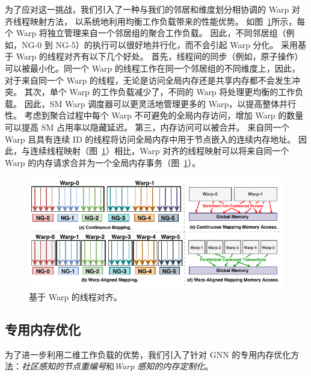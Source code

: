 为了应对这一挑战，我们引入了一种与我们的邻居和维度划分相协调的 Warp 对齐线程映射方法，
以系统地利用均衡工作负载带来的性能优势。
如图~\ref{fig: warp-based Thread Alignment}所示，每个 Warp 将独立管理来自一个邻居组的聚合工作负载。
因此，不同邻居组（例如，NG-0 到 NG-5）的执行可以很好地并行化，而不会引起 Warp 分化。
采用基于 Warp 的线程对齐有以下几个好处。
首先，线程间的同步（例如，原子操作）可以被最小化。同一个 Warp 的线程工作在同一个邻居组的不同维度上，因此，对于来自同一个 Warp 的线程，无论是访问全局内存还是共享内存都不会发生冲突。
其次，单个 Warp 的工作负载减少了，不同的 Warp 将处理更均衡的工作负载。
因此，SM Warp 调度器可以更灵活地管理更多的 Warp，以提高整体并行性。
考虑到聚合过程中每个 Warp 不可避免的全局内存访问，增加 Warp 的数量可以提高 SM 占用率以隐藏延迟。
第三，内存访问可以被合并。
来自同一个 Warp 且具有连续 ID 的线程将访问全局内存中用于节点嵌入的连续内存地址。
因此，与连续线程映射（图~\ref{fig: warp-based Thread Alignment}）相比，Warp 对齐的线程映射可以将来自同一个 Warp 的内存请求合并为一个全局内存事务（图~\ref{fig: warp-based Thread Alignment}）。
\begin{figure} [t] \small
    \centering
    \includegraphics[width=0.9\columnwidth]{images/warp-alignment.pdf}
    \caption{基于 Warp 的线程对齐。}
    \label{fig: warp-based Thread Alignment}
    \setlength{\abovecaptionskip}{0.4cm} %
    \setlength{\belowcaptionskip}{-0.4cm} %
\end{figure}
\subsection{专用内存优化}
\label{sect: Specialized Memory Optimization}
为了进一步利用二维工作负载的优势，我们引入了针对 GNN 的专用内存优化方法：\textit{社区感知的节点重编号}和\textit{Warp 感知的内存定制化}。


